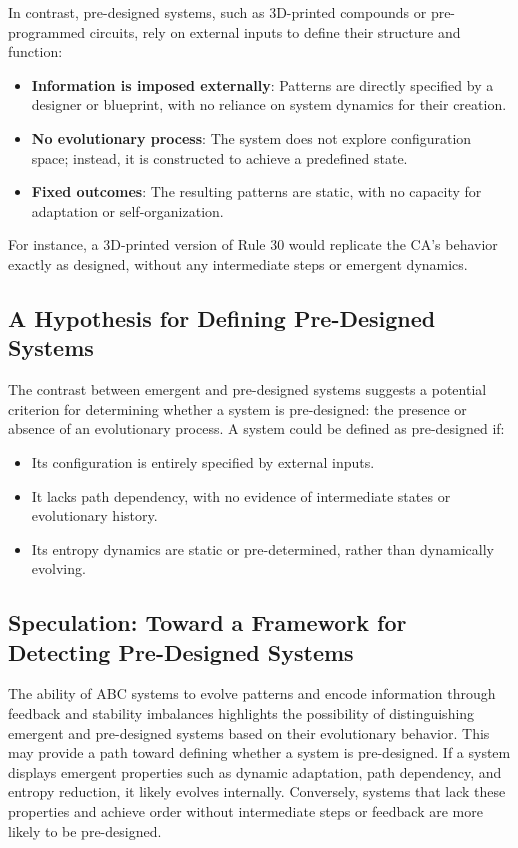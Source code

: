 \documentclass[entropy,article,submit,pdftex,moreauthors]{Definitions/mdpi}
\begin{document}
In contrast, pre-designed systems, such as 3D-printed compounds or pre-programmed circuits, rely on external inputs to define their structure and function:
\begin{itemize}
    \item \textbf{Information is imposed externally}: Patterns are directly specified by a designer or blueprint, with no reliance on system dynamics for their creation.
    \item \textbf{No evolutionary process}: The system does not explore configuration space; instead, it is constructed to achieve a predefined state.
    \item \textbf{Fixed outcomes}: The resulting patterns are static, with no capacity for adaptation or self-organization.
\end{itemize}
For instance, a 3D-printed version of Rule 30 would replicate the CA’s behavior exactly as designed, without any intermediate steps or emergent dynamics.

\subsection{A Hypothesis for Defining Pre-Designed Systems}

The contrast between emergent and pre-designed systems suggests a potential criterion for determining whether a system is pre-designed: the presence or absence of an evolutionary process. A system could be defined as pre-designed if:
\begin{itemize}
    \item Its configuration is entirely specified by external inputs.
    \item It lacks path dependency, with no evidence of intermediate states or evolutionary history.
    \item Its entropy dynamics are static or pre-determined, rather than dynamically evolving.
\end{itemize}

\subsection{Speculation: Toward a Framework for Detecting Pre-Designed Systems}

The ability of ABC systems to evolve patterns and encode information through feedback and stability imbalances highlights the possibility of distinguishing emergent and pre-designed systems based on their evolutionary behavior. This may provide a path toward defining whether a system is pre-designed. If a system displays emergent properties such as dynamic adaptation, path dependency, and entropy reduction, it likely evolves internally. Conversely, systems that lack these properties and achieve order without intermediate steps or feedback are more likely to be pre-designed.
\end{document}
